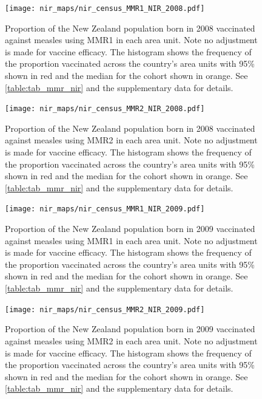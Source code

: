 \documentclass{article}
\begin{document}
\begin{figure}
\begin{center}
    \texttt{[image: nir\_maps/nir\_census\_MMR1\_NIR\_2008.pdf]}
\end{center}
    \caption{Proportion of the New Zealand population born in 2008 vaccinated against measles using MMR1 in each area unit. Note no adjustment is made for vaccine efficacy. The histogram shows the frequency of the proportion vaccinated across the country's area units with 95\% shown in red and the median for the cohort shown in orange. See \autoref{table:tab_mmr_nir} and the supplementary data for details.}
\label{fig:fig12008}
\end{figure}


\begin{figure}
\begin{center}
    \texttt{[image: nir\_maps/nir\_census\_MMR2\_NIR\_2008.pdf]}
 \end{center}
    \caption{Proportion of the New Zealand population born in 2008 vaccinated against measles using MMR2 in each area unit. Note no adjustment is made for vaccine efficacy. The histogram shows the frequency of the proportion vaccinated across the country's area units with 95\% shown in red and the median for the cohort shown in orange. See \autoref{table:tab_mmr_nir} and the supplementary data for details.}
\label{fig:fig22008}
\end{figure}


\begin{figure}
\begin{center}
    \texttt{[image: nir\_maps/nir\_census\_MMR1\_NIR\_2009.pdf]}
 \end{center}
    \caption{Proportion of the New Zealand population born in 2009 vaccinated against measles using MMR1 in each area unit. Note no adjustment is made for vaccine efficacy. The histogram shows the frequency of the proportion vaccinated across the country's area units with 95\% shown in red and the median for the cohort shown in orange. See \autoref{table:tab_mmr_nir} and the supplementary data for details.}
\label{fig:fig12009}
\end{figure}


\begin{figure}
\begin{center}
    \texttt{[image: nir\_maps/nir\_census\_MMR2\_NIR\_2009.pdf]}
 \end{center}
    \caption{Proportion of the New Zealand population born in 2009 vaccinated against measles using MMR2 in each area unit. Note no adjustment is made for vaccine efficacy. The histogram shows the frequency of the proportion vaccinated across the country's area units with 95\% shown in red and the median for the cohort shown in orange. See \autoref{table:tab_mmr_nir} and the supplementary data for details.}
\label{fig:fig22009}
\end{figure}
\end{document}
